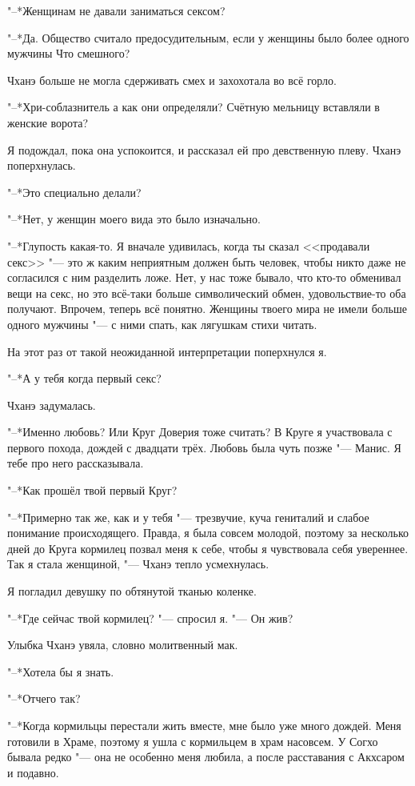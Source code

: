 \documentclass[a4paper,10pt,fleqn]{book}
\newcommand{\ldotst}{\so{...}\xspace}
\begin{document}
"--*Женщинам не давали заниматься сексом?

"--*Да.
Общество считало предосудительным, если у женщины было более одного мужчины\ldotst
Что смешного?

Чханэ больше не могла сдерживать смех и захохотала во всё горло.

"--*Хри-соблазнитель\ldotst а как\ldotst они\ldotst определяли?
Счётную мельницу вставляли в женские ворота?

Я подождал, пока она успокоится, и рассказал ей про девственную плеву.
Чханэ поперхнулась.

"--*Это специально делали?

"--*Нет, у женщин моего вида это было изначально.

"--*Глупость какая-то.
Я вначале удивилась, когда ты сказал <<продавали секс>> "--- это ж каким неприятным должен быть человек, чтобы никто даже не согласился с ним разделить ложе.
Нет, у нас тоже бывало, что кто-то обменивал вещи на секс, но это всё-таки больше символический обмен, удовольствие-то оба получают.
Впрочем, теперь всё понятно.
Женщины твоего мира не имели больше одного мужчины "--- с ними спать, как лягушкам стихи читать.

На этот раз от такой неожиданной интерпретации поперхнулся я.

"--*А у тебя когда первый секс?

Чханэ задумалась.

"--*Именно любовь?
Или Круг Доверия тоже считать?
В Круге я участвовала с первого похода, дождей с двадцати трёх.
Любовь была чуть позже "--- Манис.
Я тебе про него рассказывала.

"--*Как прошёл твой первый Круг?

"--*Примерно так же, как и у тебя "--- трезвучие, куча гениталий и слабое понимание происходящего.
Правда, я была совсем молодой, поэтому за несколько дней до Круга кормилец позвал меня к себе, чтобы я чувствовала себя увереннее.
Так я стала женщиной, "--- Чханэ тепло усмехнулась.

Я погладил девушку по обтянутой тканью коленке.

"--*Где сейчас твой кормилец? "--- спросил я.
"--- Он жив?

Улыбка Чханэ увяла, словно молитвенный мак.

"--*Хотела бы я знать.

"--*Отчего так?

"--*Когда кормильцы перестали жить вместе, мне было уже много дождей.
Меня готовили в Храме, поэтому я ушла с кормильцем в храм насовсем.
У Согхо бывала редко "--- она не особенно меня любила, а после расставания с Акхсаром и подавно.
\end{document}
